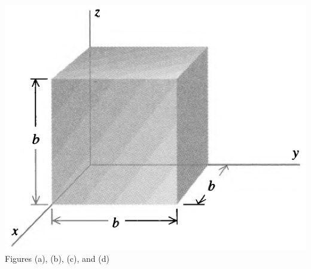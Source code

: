 \documentclass[11pt,letterpaper,boxed]{hmcpset}
\begin{document}
\begin{problem}[Schey II-10]
\begin{center}
			\includegraphics[scale=0.25]{II-10d.png}
			\\Figures (a), (b), (c), and (d)
		\end{center}
			
		
	\end{problem}
	
	\begin{solution}
		\vfill
	\end{solution}
	\newpage
\end{document}
